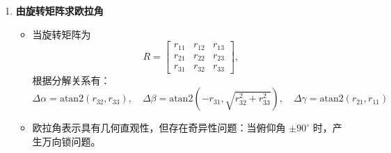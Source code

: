 \documentclass[../main.tex]{subfiles}
\begin{document}
\begin{enumerate}
    \item \textbf{由旋转矩阵求欧拉角}
    \begin{itemize}
        \item 当旋转矩阵为
        \[
        R = 
        \begin{bmatrix}
            r_{11} & r_{12} & r_{13} \\
            r_{21} & r_{22} & r_{23} \\
            r_{31} & r_{32} & r_{33}
        \end{bmatrix},
        \]
        根据分解关系有：
        \[
        \Delta\alpha = \mathrm{atan2}(r_{32}, r_{33}), \quad
        \Delta\beta = \mathrm{atan2}(-r_{31}, \sqrt{r_{32}^2 + r_{33}^2}), \quad
        \Delta\gamma = \mathrm{atan2}(r_{21}, r_{11})
        \]
        \item {欧拉角表示具有几何直观性，但存在奇异性问题：当俯仰角 $\pm 90^\circ$ 时，产生万向锁问题。}
    \end{itemize}


\end{enumerate}
\end{document}

